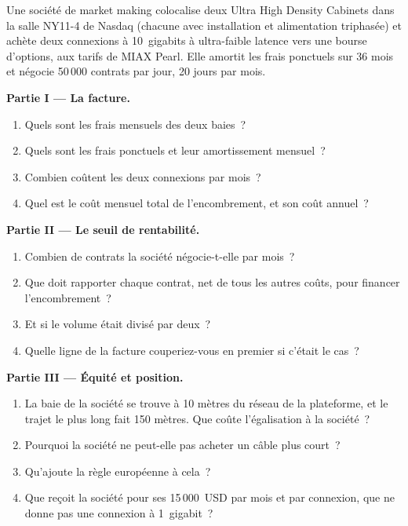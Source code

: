 \begin{problem}\label{pb:nw:colocation-products-and-how-they-are-sold:1}
Une société de market making colocalise deux Ultra High Density Cabinets dans la salle NY11-4 de Nasdaq (chacune avec installation et alimentation triphasée) et
achète deux connexions à 10~gigabits à ultra-faible latence vers une bourse d'options, aux tarifs de MIAX Pearl. Elle amortit les frais ponctuels sur 36 mois et
négocie 50\,000 contrats par jour, 20 jours par mois.

\medskip\noindent\textbf{Partie I --- La facture.}
\begin{enumerate}
\item Quels sont les frais mensuels des deux baies~?
\item Quels sont les frais ponctuels et leur amortissement mensuel~?
\item Combien coûtent les deux connexions par mois~?
\item Quel est le coût mensuel total de l'encombrement, et son coût annuel~?
\end{enumerate}

\medskip\noindent\textbf{Partie II --- Le seuil de rentabilité.}
\begin{enumerate}[resume]
\item Combien de contrats la société négocie-t-elle par mois~?
\item Que doit rapporter chaque contrat, net de tous les autres coûts, pour financer l'encombrement~?
\item Et si le volume était divisé par deux~?
\item Quelle ligne de la facture couperiez-vous en premier si c'était le cas~?
\end{enumerate}

\medskip\noindent\textbf{Partie III --- Équité et position.}
\begin{enumerate}[resume]
\item La baie de la société se trouve à 10 mètres du réseau de la plateforme, et le trajet le plus long fait 150 mètres. Que coûte l'égalisation à la société~?
\item Pourquoi la société ne peut-elle pas acheter un câble plus court~?
\item Qu'ajoute la règle européenne à cela~?
\item Que reçoit la société pour ses 15\,000~USD par mois et par connexion, que ne donne pas une connexion à 1~gigabit~?
\end{enumerate}


\end{problem}
